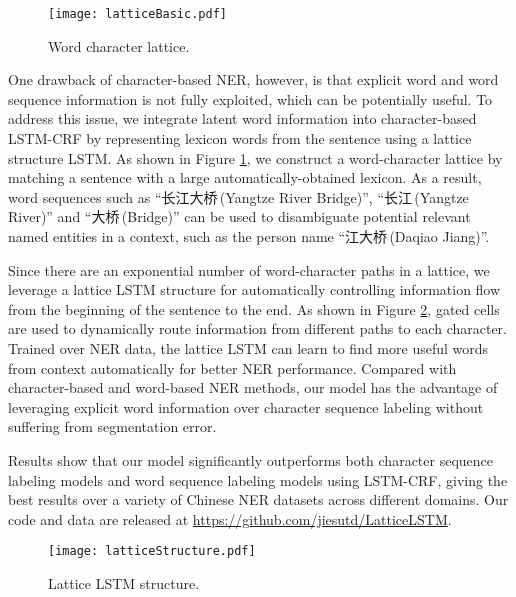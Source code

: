\documentclass[11pt,a4paper]{article}
\begin{document}
\begin{CJK*}{UTF8}{gbsn}
\begin{figure}[!tp] 
  \centering 
  \texttt{[image: latticeBasic.pdf]}
  \vspace*{-5mm}
  \caption{Word character lattice.}
  \label{fig:latticebasic}
\end{figure}
One drawback of character-based NER, however, is that explicit word and word sequence information is not fully exploited, which can be potentially useful. To address this issue, we integrate latent word information into character-based LSTM-CRF by representing lexicon words from the sentence using a lattice structure LSTM. As shown in Figure \ref{fig:latticebasic}, we construct a word-character lattice by matching a sentence with a large automatically-obtained lexicon. As a result, word sequences such as ``长江大桥\,(Yangtze River Bridge)'', ``长江\,(Yangtze River)'' and ``大桥\,(Bridge)'' can be used to disambiguate potential relevant named entities in a context, such as the person name ``江大桥\,(Daqiao Jiang)''. 

Since there are an exponential number of word-character paths in a lattice, we leverage a lattice LSTM structure for automatically controlling information flow from the beginning of the sentence to the end.  As shown in Figure \ref{fig:latticestructure}, gated cells are used to dynamically route information from different paths to each character. Trained over NER data, the lattice LSTM can learn to find more useful words from context automatically for better NER performance. Compared with character-based and word-based NER methods, our model has the advantage of leveraging explicit word information over character sequence labeling without suffering from segmentation error. 

Results show that our model significantly outperforms both character sequence labeling models and word sequence labeling models using LSTM-CRF, giving the best results over a variety of Chinese NER datasets across different domains. Our code and data are released at \url{https://github.com/jiesutd/LatticeLSTM}.

\begin{figure}[!tp] 
  \centering 
  \texttt{[image: latticeStructure.pdf]}
  \vspace*{-5mm}
  \caption{Lattice LSTM structure.}
  \label{fig:latticestructure}
\end{figure}



\end{CJK*}
\end{document}
